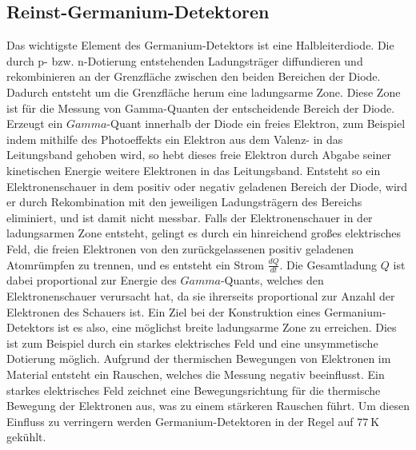 \subsection{Reinst-Germanium-Detektoren}
\label{subsec:Wirkungsweise}
Das wichtigste Element des Germanium-Detektors ist eine Halbleiterdiode.
Die durch p- bzw. n-Dotierung entstehenden Ladungsträger diffundieren und rekombinieren an der Grenzfläche zwischen den beiden Bereichen der Diode.
Dadurch entsteht um die Grenzfläche herum eine ladungsarme Zone.
Diese Zone ist für die Messung von Gamma-Quanten der entscheidende Bereich der Diode.
Erzeugt ein $Gamma$-Quant innerhalb der Diode ein freies Elektron, zum Beispiel indem mithilfe des Photoeffekts ein Elektron aus dem Valenz- in das Leitungsband gehoben wird, so hebt dieses freie Elektron durch Abgabe seiner kinetischen Energie weitere Elektronen in das Leitungsband.
Entsteht so ein Elektronenschauer in dem positiv oder negativ geladenen Bereich der Diode, wird er durch Rekombination mit den jeweiligen Ladungsträgern des Bereichs eliminiert, und ist damit nicht messbar.
Falls der Elektronenschauer in der ladungsarmen Zone entsteht, gelingt es durch ein hinreichend großes elektrisches Feld, die freien Elektronen von den zurückgelassenen positiv geladenen Atomrümpfen zu trennen, und es entsteht ein Strom $\frac{dQ}{dt}$.
Die Gesamtladung $Q$ ist dabei proportional zur Energie des $Gamma$-Quants, welches den Elektronenschauer verursacht hat, da sie ihrerseits proportional zur Anzahl der Elektronen des Schauers ist.
Ein Ziel bei der Konstruktion eines Germanium-Detektors ist es also, eine möglichst breite ladungsarme Zone zu erreichen.
Dies ist zum Beispiel durch ein starkes elektrisches Feld und eine unsymmetische Dotierung möglich.
Aufgrund der thermischen Bewegungen von Elektronen im Material entsteht ein Rauschen, welches die Messung negativ beeinflusst.
Ein starkes elektrisches Feld zeichnet eine Bewegungsrichtung für die thermische Bewegung der Elektronen aus, was zu einem stärkeren Rauschen führt.
Um diesen Einfluss zu verringern werden Germanium-Detektoren in der Regel auf $\SI{77}{\kelvin}$ gekühlt.

